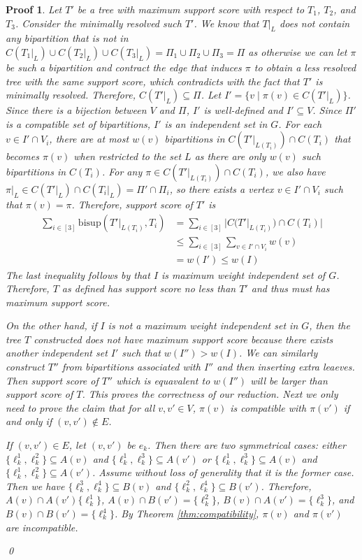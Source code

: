 \documentclass{bmcart}
\newcommand{\bs}{\mathrm{bisup}}
\theoremstyle{mystyle}
\theoremstyle{proofstyle}
\newtheorem*{proof2}{Proof}
\newenvironment{proofnospace}{\begin{proof2}}{\qed \end{proof2}}
\begin{document}
\begin{proofnospace}
  Let $T'$ be a tree with maximum support score with respect to $T_1$, $T_2$, and $T_3$. Consider the minimally resolved such $T'$. We know that $T|_L$ does not contain any bipartition that is not in $C(T_1|_L) \cup C(T_2|_L) \cup C(T_3|_L) = \Pi_1 \cup \Pi_2 \cup \Pi_3 = \Pi$ as otherwise we can let $\pi$ be such a bipartition and contract the edge that induces $\pi$ to obtain a less resolved tree with the same support score, which contradicts with the fact that $T'$ is minimally resolved. Therefore, $C(T'|_L) \subseteq \Pi$. Let $I' = \{v \mid \pi(v) \in C(T'|_L)\}$. Since there is a bijection between $V$ and $\Pi$, $I'$ is well-defined and $I' \subseteq V$. Since $\Pi'$ is a compatible set of bipartitions, $I'$ is an independent set in $G$. For each $v \in I'\cap V_i$, there are at most $w(v)$ bipartitions in $C(T'|_{L(T_i)}) \cap C(T_i)$ that becomes $\pi(v)$ when restricted to the set $L$ as there are only $w(v)$ such bipartitions in $C(T_i)$. For any $\pi \in C(T'|_{L(T_i)}) \cap C(T_i)$, we also have $\pi|_L \in C(T'|_L) \cap C(T_i|_L) = \Pi' \cap \Pi_i$, so there exists a vertex $v \in I' \cap V_i$ such that $\pi(v) = \pi$. Therefore, support score of $T'$ is 
  \begin{align*}
    \sum_{i \in [3]} \bs(T'|_{L(T_i)}, T_i) &= \sum_{i \in [3]} |C(T'|_{L(T_i)}) \cap C(T_i)|\\
    &\le \sum_{i \in [3]} \sum_{v \in I' \cap V_i} w(v) \\
    &= w(I') \le w(I) 
  \end{align*}
  The last inequality follows by that $I$ is maximum weight independent set of $G$. Therefore, $T$ as defined has support score no less than $T'$ and thus must has maximum support score. \smallskip

  On the other hand, if $I$ is not a maximum weight independent set in $G$, then the tree $T$ constructed does not have maximum support score because there exists another independent set $I'$ such that $w(I'') > w(I)$. We can similarly construct $T''$ from bipartitions associated with $I''$ and then inserting extra leaeves. Then support score of $T''$ which is equavalent to $w(I'')$ will be larger than support score of $T$. This proves the correctness of our reduction. Next we only need to prove the claim that for all $v,v' \in V$, $\pi(v)$ is compatible with $\pi(v')$ if and only if $(v,v') \notin E$. \smallskip

  If $(v,v') \in E$, let $(v,v')$ be $e_k$. Then there are two symmetrical cases: either $\{\ell_k^1,\ell_k^2\} \subseteq A(v)$ and $\{\ell_k^1,\ell_k^3\} \subseteq A(v')$ or $\{\ell_k^1,\ell_k^3\} \subseteq A(v)$ and $\{\ell_k^1,\ell_k^2\} \subseteq A(v')$. Assume without loss of generality that it is the former case. Then we have  $\{\ell_k^3,\ell_k^4\} \subseteq B(v)$ and $\{\ell_k^2,\ell_k^4\} \subseteq B(v')$. Therefore, $A(v) \cap A(v') \{\ell_k^1\}$, $A(v) \cap B(v') = \{\ell_k^2\}$, $B(v) \cap A(v')= \{\ell_k^3\}$, and $B(v) \cap B(v') = \{\ell_k^4\}$. By Theorem \ref{thm:compatibility}, $\pi(v)$ and $\pi(v')$ are incompatible.\smallskip


\end{proofnospace}
\end{document}

